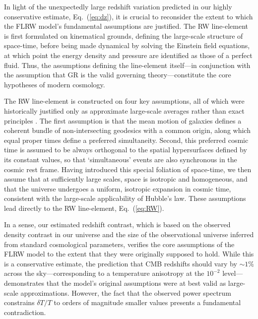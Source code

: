 \documentclass[aps,prd,reprint,superscriptaddress]{revtex4-2}
\begin{document}
In light of the unexpectedly large redshift variation predicted in our highly conservative estimate, Eq.~(\ref{eq:dz}), it is crucial to reconsider the extent to which the FLRW model's fundamental assumptions are justified. The RW line-element is first formulated on kinematical grounds, defining the large-scale structure of space-time, before being made dynamical by solving the Einstein field equations, at which point the energy density and pressure are identified as those of a perfect fluid. Thus, the assumptions defining the line-element itself---in conjunction with the assumption that GR is the valid governing theory---constitute the core hypotheses of modern cosmology.

The RW line-element is constructed on four key assumptions, all of which were historically justified only as approximate large-scale averages rather than exact principles \cite{Robertson1933}. The first assumption is that the mean motion of galaxies defines a coherent bundle of non-intersecting geodesics with a common origin, along which equal proper times define a preferred simultaneity. Second, this preferred cosmic time is assumed to be always orthogonal to the spatial hypersurfaces defined by its constant values, so that `simultaneous' events are also synchronous in the cosmic rest frame. Having introduced this special foliation of space-time, we then assume that at sufficiently large scales, space is isotropic and homogeneous, and that the universe undergoes a uniform, isotropic expansion in cosmic time, consistent with the large-scale applicability of Hubble's law. These assumptions lead directly to the RW line-element, Eq.~(\ref{eq:RW}).

In a sense, our estimated redshift contrast, which is based on the observed density contrast in our universe and the size of the observational universe inferred from standard cosmological parameters, verifies the core assumptions of the FLRW model to the extent that they were originally supposed to hold. While this is a conservative estimate, the prediction that CMB redshifts should vary by $\sim 1\%$ across the sky---corresponding to a temperature anisotropy at the $10^{-2}$ level---demonstrates that the model's original assumptions were at best valid as large-scale approximations. However, the fact that the observed power spectrum constrains $\delta T/T$ to orders of magnitude smaller values presents a fundamental contradiction.
\end{document}
